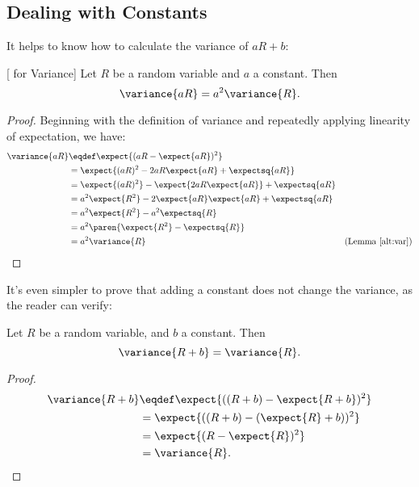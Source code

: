 \subsection{Dealing with Constants}

It helps to know how to calculate the variance of $aR+b$:

\begin{theorem}\label{var.const}[ for Variance]
Let $R$ be a random variable and $a$ a constant.  Then
\begin{equation}\label{a2R}
\variance{a R} = a^2 \variance{R}.
\end{equation}
\end{theorem}

\begin{proof}
Beginning with the definition of variance and repeatedly applying
linearity of expectation, we have:
\begin{align*}
\variance{aR}
    & \eqdef \expect{(aR-\expect{aR})^2}\\
    & = \expect{(aR)^2 -2aR\expect{aR} + \expectsq{aR}}\\
    & = \expect{(aR)^2} -\expect{2aR\expect{aR}} + \expectsq{aR}\\
    & = a^2\expect{R^2} -2\expect{aR}\expect{aR} + \expectsq{aR}\\
    & = a^2\expect{R^2} -a^2\expectsq{R}\\
    & = a^2\paren{\expect{R^2} - \expectsq{R}}\\
    & = a^2\variance{R} & \text{(Lemma~\ref{alt:var})}
\end{align*}
\end{proof}

It's even simpler to prove that adding a constant does not change the
variance, as the reader can verify:
\begin{theorem}\label{var+const}
Let $R$ be a random variable, and $b$ a constant. Then
\begin{equation}\label{R+b}
\variance{R+b} = \variance{R}.
\end{equation}
\end{theorem}

\begin{solution}
\begin{proof}
\begin{align*}
\variance{R+b} & \eqdef \expect{((R+b) - \expect{R+b})^2}\\
               & =  \expect{((R+b) - (\expect{R}+ b))^2}\\
               & =  \expect{(R - \expect{R})^2}\\
               & = \variance{R}.
\end{align*}
\end{proof}

\end{solution}

